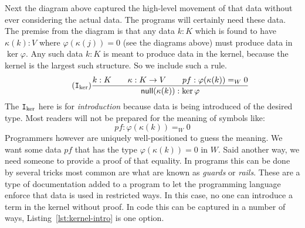 \documentclass[12pt,twoside,dvipsnames,letterpaper]{memoir}
\begin{document}
Next the diagram above captured the high-level movement of that data without 
ever considering the actual data.  The programs will certainly need these 
data.  The premise from the diagram is that any data $k:K$ which is found to 
have $\kappa(k):V$ where $\varphi(\kappa(j))=0$ (see the diagrams above) must 
produce data in $\ker\varphi$.
Any such data $k:K$ is meant to produce data in the kernel, because the 
kernel is the largest such structure.  So we include such a rule.
\begin{gather}
    \tag{$\intro{\ker}$}
    \frac{
        k:K\qquad \kappa:K\to V\qquad pf:\varphi(\kappa(k))=_W 0
    }{
        \mathsf{null}(\kappa(k)):\ker\varphi
    }
\end{gather}
The $\mathtt{I}_{\ker}$ here is for \emph{introduction} because data is 
being introduced of the desired type.  
Most readers will not be prepared for the meaning of symbols like:
\[
    pf:\varphi(\kappa(k))=_W 0
\] 
Programmers however are uniquely well-positioned to guess the meaning. We want
some data $pf$ that has the type $\varphi(\kappa(k))=0$ in $W$. Said another
way, we need someone to provide a proof of that equality. In programs this can
be done by several tricks most common are what are known as \emph{guards} or
\emph{rails}.  These are a type of documentation added to a program to let the
programming language enforce that data is used in restricted ways.  In this
case, no one can introduce a term in the kernel without proof. In code this can
be captured in a number of ways, Listing~\ref{lst:kernel-intro} is one option.

\end{document}
